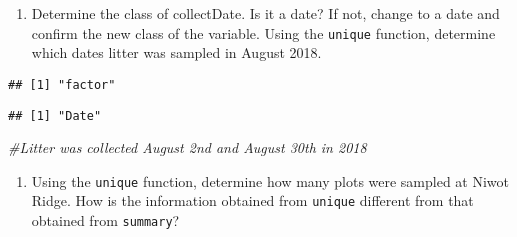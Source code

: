 \documentclass[]{article}
\newenvironment{Shaded}{\begin{snugshade}}{\end{snugshade}}
\newcommand{\CommentTok}[1]{\textcolor[rgb]{0.56,0.35,0.01}{\textit{#1}}}
\newcommand{\DataTypeTok}[1]{\textcolor[rgb]{0.13,0.29,0.53}{#1}}
\newcommand{\KeywordTok}[1]{\textcolor[rgb]{0.13,0.29,0.53}{\textbf{#1}}}
\newcommand{\NormalTok}[1]{#1}
\newcommand{\OperatorTok}[1]{\textcolor[rgb]{0.81,0.36,0.00}{\textbf{#1}}}
\newcommand{\StringTok}[1]{\textcolor[rgb]{0.31,0.60,0.02}{#1}}
\providecommand{\tightlist}{%
  \setlength{\itemsep}{0pt}\setlength{\parskip}{0pt}}
\begin{document}
\begin{enumerate}
\def\labelenumi{\arabic{enumi}.}
\setcounter{enumi}{11}
\tightlist
\item
  Determine the class of collectDate. Is it a date? If not, change to a
  date and confirm the new class of the variable. Using the
  \texttt{unique} function, determine which dates litter was sampled in
  August 2018.
\end{enumerate}

\begin{Shaded}
\end{Shaded}

\begin{verbatim}
## [1] "factor"
\end{verbatim}

\begin{Shaded}
\end{Shaded}

\begin{verbatim}
## [1] "Date"
\end{verbatim}

\begin{Shaded}
\begin{Highlighting}[]
\CommentTok{#Litter was collected August 2nd and August 30th in 2018}
\end{Highlighting}
\end{Shaded}

\begin{enumerate}
\def\labelenumi{\arabic{enumi}.}
\setcounter{enumi}{12}
\tightlist
\item
  Using the \texttt{unique} function, determine how many plots were
  sampled at Niwot Ridge. How is the information obtained from
  \texttt{unique} different from that obtained from \texttt{summary}?
\end{enumerate}

\begin{Shaded}
\end{Shaded}
\end{document}
